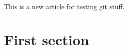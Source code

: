 \documentclass{article}
\begin{document}
This is a new article for testing git stuff.

\section{First section}
\end{document}
